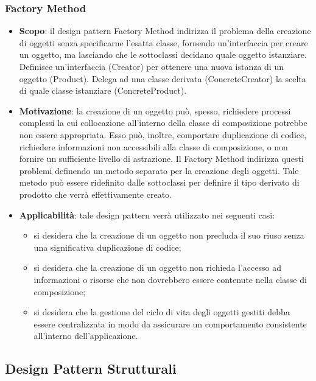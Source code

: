 		\subsubsection{Factory Method}
		\begin{itemize}
		\item \textbf{Scopo}: il design pattern Factory Method indirizza il problema della creazione
di oggetti senza specificarne l’esatta classe, fornendo un’interfaccia per creare un oggetto, ma lasciando che le sottoclassi decidano quale oggetto istanziare. Definisce un’interfaccia (Creator) per ottenere una nuova istanza di un oggetto (Product). Delega ad una classe derivata (ConcreteCreator) la scelta di quale classe istanziare (ConcreteProduct).
		\item \textbf{Motivazione}: la creazione di un oggetto può, spesso, richiedere processi complessi la cui collocazione all’interno della classe di composizione potrebbe non essere appropriata. Esso può, inoltre, comportare duplicazione di codice, richiedere informazioni non accessibili alla classe di composizione, o non fornire un sufficiente livello di astrazione.
Il Factory Method indirizza questi problemi definendo un metodo separato per la creazione degli oggetti. Tale metodo può essere ridefinito dalle sottoclassi per definire il tipo derivato di prodotto che verrà effettivamente creato.
		\item \textbf{Applicabilità}: tale design pattern verrà utilizzato nei seguenti casi:
		\begin{itemize}
		\item si desidera che la creazione di un oggetto non precluda il suo riuso senza una significativa duplicazione di codice;
		\item si desidera che la creazione di un oggetto non richieda l’accesso ad informazioni o risorse che non dovrebbero essere contenute nella classe di composizione;
		\item si desidera che la gestione del ciclo di vita degli oggetti gestiti debba essere centralizzata in modo da assicurare un comportamento consistente all’interno dell’applicazione.
		\end{itemize}
		\end{itemize}				
		
	\subsection{Design Pattern Strutturali}

